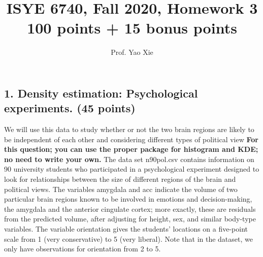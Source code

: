 \documentclass[twoside,12pt]{article}
\begin{document}
\title{ISYE 6740, Fall 2020, Homework 3\\{\small 100 points + 15 bonus points}}
\author{Prof. Yao Xie}
\date{}
\maketitle

\subsection*{1. Density estimation: Psychological experiments. (45 points)}

We will use this data to study whether or not the two brain regions are likely to be independent of each other and considering different types of political view \textbf{For this question; you can use the proper package for histogram and KDE; no need to write your own.} The data set \textsf{n90pol.csv} contains information on 90 university students who participated in a psychological experiment designed to look for relationships between the size of different regions of the brain and political views. The variables \textsf{amygdala} and \textsf{acc} indicate the volume of two particular brain regions known to be involved in emotions and decision-making, the amygdala and the anterior cingulate cortex; more exactly, these are residuals from the predicted volume, after adjusting for height, sex, and similar body-type variables. The variable \textsf{orientation} gives the students' locations on a five-point scale from 1 (very conservative) to 5 (very liberal).  Note that in the dataset, we only have observations for orientation from 2 to 5. 
  
\end{document}
